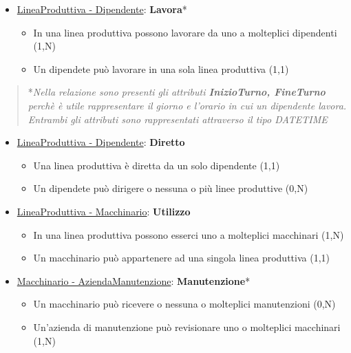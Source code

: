 \begin{itemize}
	\item \underline{LineaProduttiva - Dipendente}: \textbf{Lavora}*
	
	\begin{itemize}
		\item In una linea produttiva possono lavorare da uno a molteplici dipendenti (1,N)
		\item Un dipendete può lavorare in una sola linea produttiva (1,1)
	\end{itemize}
	
\end{itemize}

\begin{verse}
	*\emph{Nella relazione sono presenti gli attributi \textbf{InizioTurno, FineTurno} perchè è utile rappresentare il giorno e l'orario in cui un dipendente lavora. Entrambi gli attributi sono rappresentati attraverso il tipo DATETIME}
\end{verse}

\begin{itemize}
	\item \underline{LineaProduttiva - Dipendente}: \textbf{Diretto}
	
	\begin{itemize}
		\item Una linea produttiva è diretta da un solo dipendente (1,1)
		\item Un dipendete può dirigere o nessuna o più linee produttive (0,N)
	\end{itemize}
	
\end{itemize}

\begin{itemize}
	\item \underline{LineaProduttiva - Macchinario}: \textbf{Utilizzo}
	
	\begin{itemize}
		\item In una linea produttiva possono esserci uno a molteplici macchinari (1,N)
		\item Un macchinario può appartenere ad una singola linea produttiva (1,1)
	\end{itemize}
	
\end{itemize}

\begin{itemize}
	\item \underline{Macchinario - AziendaManutenzione}: \textbf{Manutenzione}*
	
	\begin{itemize}
		\item Un macchinario può ricevere o nessuna o molteplici manutenzioni (0,N)
		\item Un'azienda di manutenzione può revisionare uno o molteplici macchinari (1,N)
	\end{itemize}
	
\end{itemize}

